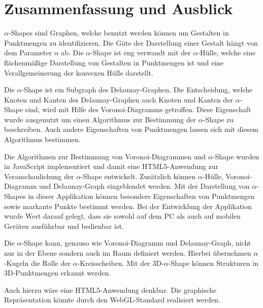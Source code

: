 
\chapter{Zusammenfassung und Ausblick}

$\alpha$-Shapes sind Graphen, welche benutzt werden können um Gestalten in Punktmengen zu identifizieren. Die Güte der Darstellung einer Gestalt hängt von dem Parameter $\alpha$ ab. Die $\alpha$-Shape ist eng verwandt mit der $\alpha$-Hülle, welche eine flächenmäßige Darstellung von Gestalten in Punktmengen ist und eine Verallgemeinerung der konvexen Hülle darstellt.

Die $\alpha$-Shape ist ein Subgraph des Delaunay-Graphen. Die Entscheidung, welche Knoten und Kanten des Delaunay-Graphen auch Knoten und Kanten der $\alpha$-Shape sind, wird mit Hilfe des Voronoi-Diagramms getroffen. Diese Eigenschaft wurde ausgenutzt um einen Algorithmus zur Bestimmung der $\alpha$-Shape zu beschreiben. Auch andere Eigenschaften von Punktmengen lassen sich mit diesem Algorithmus bestimmen.

Die Algorithmen zur Bestimmung von Voronoi-Diagrammen und $\alpha$-Shape wurden in JavaScript implementiert und damit eine HTML5-Anwendung zur Veranschaulichung der $\alpha$-Shape entwickelt. Zusätzlich können $\alpha$-Hülle, Voronoi-Dia\-gramm und Delaunay-Graph eingeblendet werden. Mit der Darstellung von $\alpha$-Shapes in dieser Applikation können besondere Eigenschaften von Punktmengen sowie markante Punkte bestimmt werden. Bei der Entwicklung der Applikation wurde Wert darauf gelegt, dass sie sowohl auf dem PC als auch auf mobilen Geräten ausführbar und bedienbar ist.

Die $\alpha$-Shape kann, genauso wie Voronoi-Diagramm und Delaunay-Graph, nicht nur in der Ebene sondern auch im Raum definiert werden. Hierbei übernehmen $\alpha$-Kugeln die Rolle der $\alpha$-Kreisscheiben. Mit der 3D-$\alpha$-Shape können Strukturen in 3D-Punktmengen erkannt werden.

Auch hierzu wäre eine HTML5-Anwendung denkbar. Die graphische Repräsentation könnte durch den WebGL-Standard realisiert werden.
